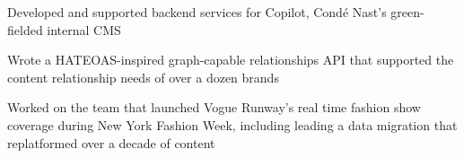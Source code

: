 \begin{job}

  \begin{accomplishments}
    \item Developed and supported backend services for Copilot, Cond\'{e} Nast's
    green-fielded internal CMS
    \item Wrote a HATEOAS-inspired graph-capable relationships API that
    supported the content relationship needs of over a dozen brands
    \item Worked on the team that launched Vogue Runway's real time fashion show
    coverage during New York Fashion Week, including leading a data migration
    that replatformed over a decade of content
  \end{accomplishments}
\end{job}
